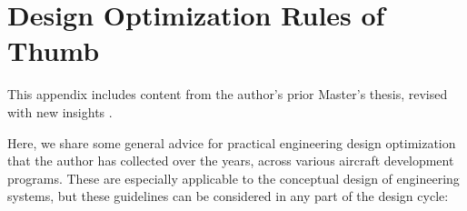 \chapter{Design Optimization Rules of Thumb}
\label{appendix:rules-of-thumb}

\begin{attrib}
    This appendix includes content from the author's prior Master's thesis, revised with new insights \cite{sharpe_aerosandbox_2021}.
\end{attrib}

Here, we share some general advice for practical engineering design optimization that the author has collected over the years, across various aircraft development programs. These are especially applicable to the conceptual design of engineering systems, but these guidelines can be considered in any part of the design cycle:

